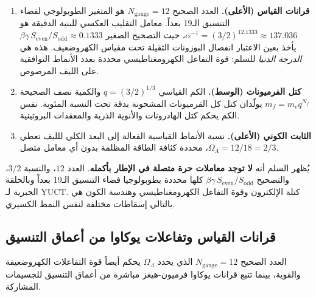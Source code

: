 \documentclass[12pt,a4paper]{article}
\begin{document}
	\begin{enumerate}[leftmargin=*]
		\item \textbf{قرانات القياس (الأعلى).} العدد الصحيح \(N_{\mathrm{gauge}} = 12\) هو المتغير الطوبولوجي لفضاء التنسيق الـ19 بعداً. معامل التقليب العكسي للبنية الدقيقة هو \(\alpha^{-1} = (3/2)^{12.1333} \approx 137.036\)، حيث التصحيح الصغير \(\beta\gamma\,S_{\mathrm{even}}/S_{\mathrm{odd}} \approx 0.1333\) يأخذ بعين الاعتبار انفصال البوزونات الثقيلة تحت مقياس الكهروضعيف. هذه هي \emph{الدرجة الدنيا} للسلم: قوة التفاعل الكهرومغناطيسي محددة بعدد الأنماط التوافقية على الليف المرصوص.
		\item \textbf{كتل الفرميونات (الوسط).} الكم القياسي \(q = (3/2)^{1/3}\) والكمية نصف الصحيحة \(m_f = m_e q^{N_f}\) يولّدان كتل كل الفرميونات المشحونة بدقة تحت النسبة المئوية. نفس الكم يحكم كتل الهادرونات والأنوية الذرية والمعقدات البروتينية.
		\item \textbf{الثابت الكوني (الأعلى).} نسبة الأنماط القياسية الفعالة إلى البعد الكلي للليف تعطي \(\Omega_\Lambda = 12/18 = 2/3\)، محددة كثافة الطاقة المظلمة بدون أي معامل متصل.
	\end{enumerate}
	
	يُظهر السلم أنه \textbf{لا توجد معاملات حرة متصلة في الإطار بأكمله}. العدد \(12\)، والنسبة \(3/2\)، والتصحيح \(\beta\gamma\,S_{\mathrm{even}}/S_{\mathrm{odd}}\) كلها محددة بطوبولوجيا فضاء التنسيق الـ19 بعداً وبالحلقة الجبرية لـ YUCT. كتلة الإلكترون وقوة التفاعل الكهرومغناطيسي وهندسة الكون هي بالتالي إسقاطات مختلفة لنفس النمط الكسيري.
	
	\subsection{قرانات القياس وتفاعلات يوكاوا من أعماق التنسيق}
	العدد الصحيح \(N_{\mathrm{gauge}} = 12\) الذي يحدد \(\Omega_\Lambda\) يحكم أيضاً قوة التفاعلات الكهروضعيفة والقوية، بينما تتبع قرانات يوكاوا فرميون-هيغز مباشرة من أعماق التنسيق للجسيمات المشاركة.
	
\end{document}
